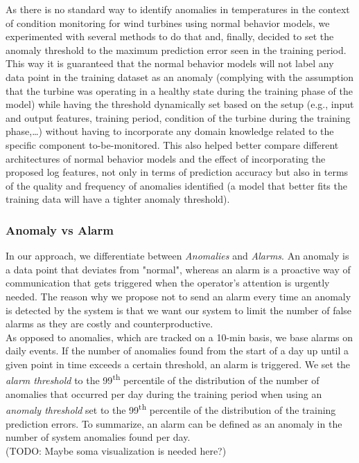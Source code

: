     \par As there is no standard way to identify anomalies in temperatures in the context of condition monitoring for wind turbines using normal behavior models, we experimented 
    with several methods to do that and, finally, decided to set the anomaly threshold to the maximum prediction error seen in the training period. This way it is 
    guaranteed that the normal behavior models will not label any data point in the training dataset as an anomaly (complying with the assumption that the turbine was operating 
    in a healthy state during the training phase of the model) while having the threshold dynamically set based on the setup (e.g., 
    input and output features, training period, condition of the turbine during the training phase,\dots) without having to incorporate any domain knowledge related to the 
    specific component to-be-monitored. This also helped better compare different architectures of normal behavior models and the effect of incorporating the proposed log features, 
    not only in terms of prediction accuracy but also in terms of the quality and frequency of anomalies identified (a model that better fits the training data will have a 
    tighter anomaly threshold).

    \subsubsection{Anomaly vs Alarm}
      In our approach, we differentiate between \emph{Anomalies} and \emph{Alarms}. An anomaly is a data point that deviates from "normal", whereas an alarm is a proactive 
      way of communication that gets triggered when the operator's attention is urgently needed. The reason why we propose not to send an alarm every time an anomaly is 
      detected by the system is that we want our system to limit the number of false alarms as they are costly and counterproductive.\\
      As opposed to anomalies, which are tracked on a 10-min basis, we base alarms on daily events. If the number of anomalies found from the start of a day up until a given 
      point in time exceeds a certain threshold, an alarm is triggered. We set the \emph{alarm threshold} to the 99\textsuperscript{th} percentile of the distribution of the number of 
      anomalies that occurred per day during the training period when using an \emph{anomaly threshold} set to the 99\textsuperscript{th} percentile of the distribution of the 
      training prediction errors. To summarize, an alarm can be defined as an anomaly in the number of system anomalies found per day.\\
      (TODO: Maybe soma visualization is needed here?)
  
